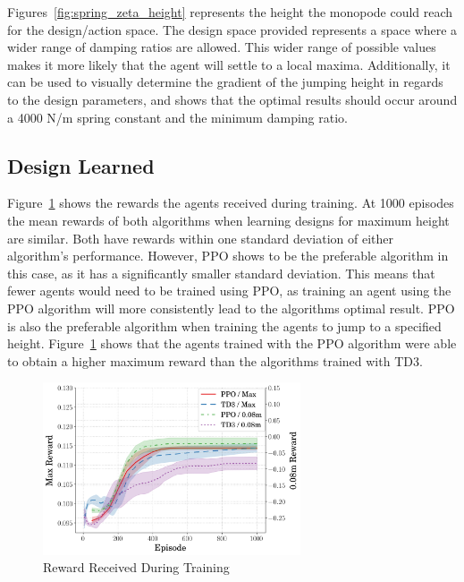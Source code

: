 \documentclass[10pt,twocolumn,letterpaper]{article}
\begin{document}
Figures~\ref{fig:spring_zeta_height} represents the height the monopode could reach for the design/action space. The design space provided represents a space where a wider range of damping ratios are allowed. This wider range of possible values makes it more likely that the agent will settle to a local maxima. Additionally, it can be used to visually determine the gradient of the jumping height in regards to the design parameters, and shows that the optimal results should occur around a 4000 N/m spring constant and the minimum damping ratio.

\subsection{Design Learned}

Figure~\ref{fig:rew_vs_step} shows the rewards the agents received during training. 
At 1000 episodes the mean rewards of both algorithms when learning designs for maximum height are similar. Both have rewards within one standard deviation of either algorithm's performance. However, PPO shows to be the preferable algorithm in this case, as it has a significantly smaller standard deviation.
This means that fewer agents would need to be trained using PPO, as training an agent using the PPO algorithm will more consistently lead to the algorithms optimal result.
PPO is also the preferable algorithm when training the agents to jump to a specified height. Figure~\ref{fig:rew_vs_step} shows that the agents trained with the PPO algorithm were able to obtain a higher maximum reward than the algorithms trained with TD3.

\begin{figure}[t]
        \begin{center}
        \includegraphics[width = 3in]{figures/ppo_vs_td3/avg_rew_comp.png}  
        \caption{Reward Received During Training}
        \label{fig:rew_vs_step}
        \end{center}
        \end{figure}
%
\end{document}
